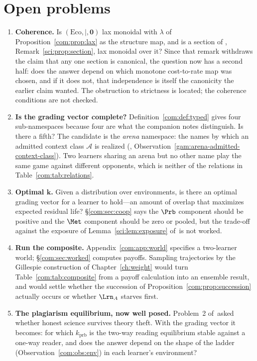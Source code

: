 \section{Open problems}\label{com:S15}

\begin{enumerate}[itemsep=4pt]
\item \textbf{Coherence.} Is $(\mathrm{Eco}, \mid, \mathbf{0})$ lax monoidal with
$\lambda$ of Proposition~\ref{com:prop:lax} as the structure map, and is a section of
\chSci, Remark~\ref{sci:prop:section}, lax monoidal over it? Since that remark withdraws the claim
that any one section is canonical, the question now has a second half: does the answer depend on which
monotone cost-to-rate map was chosen, and if it does not, that independence is itself the canonicity
the earlier claim wanted. The obstruction to strictness is located; the coherence conditions are not
checked.

\item \textbf{Is the grading vector complete?} Definition~\ref{com:def:typed} gives four
sub-namespaces because four are what the companion notes distinguish. Is there a fifth? The
candidate is the \emph{arena} namespace: the names by which an admitted context class
$\mathcal{A}$ is realized (\chGame, Observation~\ref{gam:arena-admitted-context-class}). Two learners sharing an arena but no other name
play the same game against different opponents, which is neither of the relations in
Table~\ref{com:tab:relations}.

\item \textbf{Optimal $\mathbf{k}$.} Given a distribution over environments, is there an optimal
grading vector for a learner to hold---an amount of overlap that maximizes expected residual
life? \S\ref{com:sec:coop} says the $\Prb$ component should be positive and the $\Met$ component
should be zero or pooled, but the trade-off against the exposure of Lemma~\ref{sci:lem:exposure}
of~\chSci is not worked.

\item \textbf{Run the composite.} Appendix~\ref{com:app:world} specifies a two-learner world;
\S\ref{com:sec:worked} computes payoffs. Sampling trajectories by the Gillespie construction
of Chapter~\ref{ch:weight} would turn Table~\ref{com:tab:composite} from a payoff calculation into an
ensemble result, and would settle whether the succession of Proposition~\ref{com:prop:succession}
actually occurs or whether $\Lrn_A$ starves first.

\item \textbf{The plagiarism equilibrium, now well posed.} Problem~2 of~\chSci asked
whether honest science survives theory theft. With the grading vector it becomes: for which
$k_{\mathrm{prb}}$ is the two-way reading equilibrium stable against a one-way reader, and does
the answer depend on the shape of the ladder (Observation~\ref{com:obs:env}) in each learner's
environment?


\end{enumerate}

